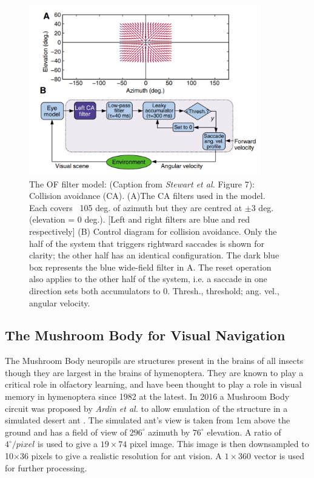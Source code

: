 \documentclass[a4paper,12pt,twoside,openright]{article}
\begin{document}
\begin{figure}[h]
 
  \centering
  \includegraphics[width=0.9\textwidth]{Stewart2010CAModel}
  \caption{
    \label{fig:stewartca} The OF filter model: (Caption from \textit{Stewart et al.} Figure 7):
    Collision avoidance (CA). (A)The CA filters used in the
    model. Each covers ~105 deg. of azimuth but they are centred
    at $\pm 3$ deg. (elevation = 0 deg.). [Left and right filters
    are blue and red respectively] (B) Control diagram for collision
    avoidance. Only the half of the system that triggers rightward
    saccades is shown for clarity; the other half has an identical
    configuration. The dark blue box represents the blue wide-field
    filter in A. The reset operation also applies to the other half of
    the system, i.e. a saccade in one direction sets both
    accumulators to 0. Thresh., threshold; ang. vel., angular velocity.
  }
 
\end{figure}

\subsection{ The Mushroom Body for Visual Navigation } \label{MBBackground}
The Mushroom Body neuropils are structures present in the brains of all insects though they are
largest in the brains of hymenoptera. They are known to play a critical role in olfactory
learning, and have been thought to play a role in visual memory in hymenoptera since 1982
at the latest\cite{Mobbs1982}. In 2016 a Mushroom Body circuit was proposed by \textit{Ardin et al.}
to allow emulation of the structure in a simulated desert ant \cite{Ardin2016}. The simulated
ant's view is taken from 1cm above the ground and has a field of view of $296^{\circ}$ azimuth
by $76^{\circ}$ elevation. A ratio of $4^{\circ}/pixel$ is used to give a $19\times74$ pixel image.
This image is then downsampled to 10$\times$36 pixels to give a realistic resolution for ant vision.
A $1\times360$ vector is used for further processing.
\newline
\end{document}
